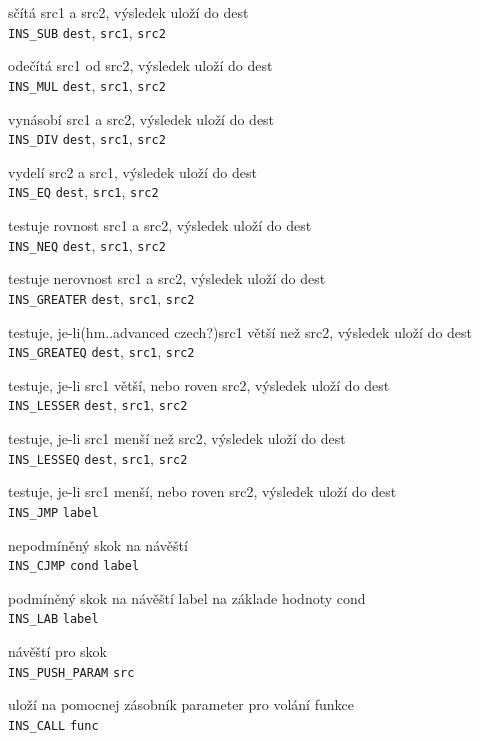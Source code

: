 \documentclass[a4paper, 12pt]{article}
\begin{document}
sčítá src1 a src2, výsledek uloží do dest\\
\texttt{INS\_SUB} \texttt{dest}, \texttt{src1}, \texttt{src2}

odečítá src1 od src2, výsledek uloží do dest\\
\texttt{INS\_MUL} \texttt{dest}, \texttt{src1}, \texttt{src2}

vynásobí src1 a src2, výsledek uloží do dest\\
\texttt{INS\_DIV} \texttt{dest}, \texttt{src1}, \texttt{src2}

vydelí src2 a src1, výsledek uloží do dest\\
\texttt{INS\_EQ} \texttt{dest}, \texttt{src1}, \texttt{src2}

testuje rovnost src1 a src2, výsledek uloží do dest\\
\texttt{INS\_NEQ} \texttt{dest}, \texttt{src1}, \texttt{src2}

testuje nerovnost src1 a src2, výsledek uloží do dest\\
\texttt{INS\_GREATER} \texttt{dest}, \texttt{src1}, \texttt{src2}

testuje, je-li(hm..advanced czech?)src1 větší než src2, výsledek uloží do dest\\
\texttt{INS\_GREATEQ} \texttt{dest}, \texttt{src1}, \texttt{src2}

testuje, je-li src1 větší, nebo roven src2, výsledek uloží do dest\\
\texttt{INS\_LESSER} \texttt{dest}, \texttt{src1}, \texttt{src2}

testuje, je-li src1 menší než src2, výsledek uloží do dest\\
\texttt{INS\_LESSEQ} \texttt{dest}, \texttt{src1}, \texttt{src2}

testuje, je-li src1 menší, nebo roven src2, výsledek uloží do dest\\
\texttt{INS\_JMP} \texttt{label}

nepodmíněný skok na návěští \\
\texttt{INS\_CJMP} \texttt{cond} \texttt{label}

podmíněný skok na návěští label na základe hodnoty cond\\
\texttt{INS\_LAB} \texttt{label}

návěští pro skok\\
\texttt{INS\_PUSH\_PARAM} \texttt{src}

uloží na pomocnej zásobník parameter pro volání funkce\\
\texttt{INS\_CALL} \texttt{func}
\end{document}
